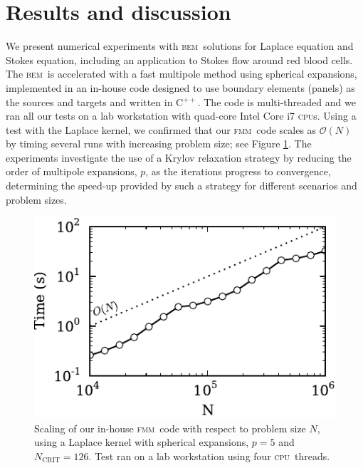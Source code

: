 \documentclass[final,leqno,]{siamltex1213}
\newcommand{\cpu}{\textsc{cpu}}
\newcommand{\bem}{\textsc{bem}\xspace}
\newcommand{\fmm}{\textsc{fmm}\xspace}
\newcommand{\cpp}{C$^{++}$}
\renewcommand{\O}[1]{\mathcal{O}(#1)}
\newcommand{\ncrit}{N_{\text{CRIT}}}
\begin{document}
\section{Results and discussion}
We present numerical experiments with \bem\ solutions for Laplace equation and Stokes equation, including an application to Stokes flow around red blood cells. The \bem\ is accelerated with a fast multipole method using spherical expansions, implemented in an in-house code designed to use boundary elements (panels) as the sources and targets and written in \cpp. The code is multi-threaded and we ran all our tests on a lab workstation with quad-core Intel Core i7 \cpu s. Using a test with the Laplace kernel, we confirmed that our \fmm\ code scales as $\O{N}$ by timing several runs with increasing problem size; see Figure \ref{fig:fmm_scaling}.
The experiments investigate the use of a Krylov relaxation strategy by reducing the order of multipole expansions, $p$, as the iterations progress to convergence, determining the speed-up provided by such a strategy for different scenarios and problem sizes.

\begin{figure}[h]
\begin{center}
	\includegraphics[width=0.5 \textwidth]{FMMScaling.pdf}
	\caption{Scaling of our in-house \fmm\ code with respect to problem size $N$, using a Laplace kernel with spherical expansions, $p=5$ and  $\ncrit = 126$. Test ran on a lab workstation using four \cpu\ threads.}
	\label{fig:fmm_scaling}
\end{center}
\end{figure}
\end{document}
